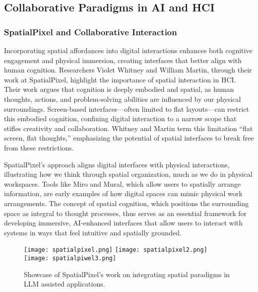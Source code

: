 \subsection{Collaborative Paradigms in AI and HCI}

\subsubsection{SpatialPixel and Collaborative Interaction}

Incorporating spatial affordances into digital interactions enhances both cognitive engagement and physical immersion, creating interfaces that better align with human cognition\cite{Kaptelinin2006ActingWT}.
Researchers Violet Whitney and William Martin, through their work at SpatialPixel, highlight the importance of spatial interaction in HCI. Their work argues that cognition is deeply embodied and spatial, as human thoughts, actions, and problem-solving abilities are influenced by our physical surroundings.
Screen-based interfaces—often limited to flat layouts—can restrict this embodied cognition, confining digital interaction to a narrow scope that stifles creativity and collaboration.
Whitney and Martin term this limitation “flat screen, flat thoughts,”\cite{whitney2024} emphasizing the potential of spatial interfaces to break free from these restrictions.

SpatialPixel’s approach aligns digital interfaces with physical interactions, illustrating how we think through spatial organization, much as we do in physical workspaces\cite{andy1998extended}.
Tools like Miro and Mural, which allow users to spatially arrange information, are early examples of how digital spaces can mimic physical work arrangements.
The concept of spatial cognition\cite{Nardi1995ContextAC}, which positions the surrounding space as integral to thought processes, thus serves as an essential framework for developing immersive, AI-enhanced interfaces that allow users to interact with systems in ways that feel intuitive and spatially grounded.

\begin{figure}[!h]
    \centering
    \texttt{[image: spatialpixel.png]}
    \texttt{[image: spatialpixel2.png]}
    \texttt{[image: spatialpiwel3.png]}
    \caption{Showcase of SpatialPixel's work on integrating spatial paradigms in LLM assisted applications.}
    \vspace{0.1cm}
    \label{fig:spatialpixel}
\end{figure}


